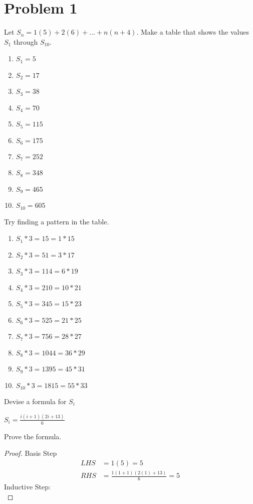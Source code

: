 \documentclass{article}
\newenvironment{problem}[1]{
  \nobreak\section*{Problem #1}
}{}
\begin{document}
  \begin{problem}{1}
    Let $S_n = 1(5) + 2(6) + \dots + n(n + 4)$. Make a table that shows the values $S_1$ through $S_10$.
    \begin{enumerate}
      \item[] $S_1 = 5$
      \item[] $S_2 = 17$
      \item[] $S_3 = 38$
      \item[] $S_4 = 70$
      \item[] $S_5 = 115$
      \item[] $S_6 = 175$
      \item[] $S_7 = 252$
      \item[] $S_8 = 348$
      \item[] $S_9 = 465$
      \item[] $S_{10} = 605$
    \end{enumerate}
    Try finding a pattern in the table.
    \begin{enumerate}
      \item[] $S_1 * 3 = 15 = 1 * 15$
      \item[] $S_2 * 3 = 51 = 3 * 17$
      \item[] $S_3 * 3 = 114 = 6 * 19$
      \item[] $S_4 * 3 = 210 = 10 * 21$
      \item[] $S_5 * 3 = 345 = 15 * 23$
      \item[] $S_6 * 3 = 525 = 21 * 25$
      \item[] $S_7 * 3 = 756 = 28 * 27$
      \item[] $S_8 * 3 = 1044 = 36 * 29$
      \item[] $S_9 * 3 = 1395 = 45 * 31$
      \item[] $S_{10} * 3 = 1815 = 55 * 33$
    \end{enumerate}
    Devise a formula for $S_i$
    \begin{center}
      $S_i = \frac{i(i + 1)(2i + 13)}{6}$
    \end{center}
    Prove the formula.
    \begin{proof}
      Basis Step
      \begin{equation*}
        \begin{split}
          LHS & = 1(5) = 5\\
          RHS & = \frac{1(1 + 1)(2(1) + 13)}{6} = 5
        \end{split}
      \end{equation*}
      Inductive Step:\\

\end{proof}
\end{problem}
\end{document}
